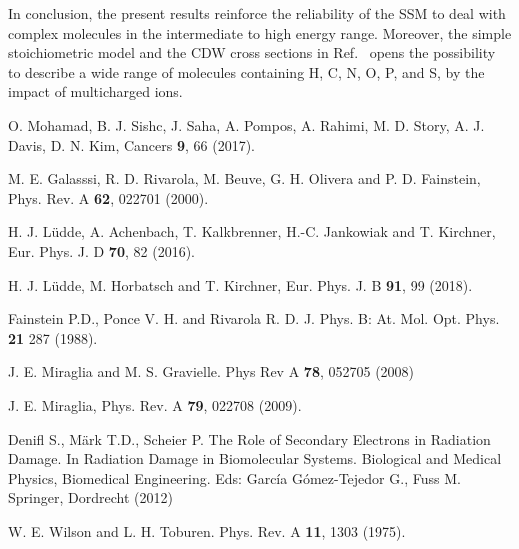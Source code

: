 \documentclass[10pt,showpacs,showkeys,twocolumn]{revtex4}
\begin{document}
In conclusion, the present results reinforce the 
reliability of the SSM to deal with complex molecules in the intermediate
to high energy range. Moreover, the simple stoichiometric model and the 
CDW cross sections in Ref.~\cite{miraglia2019} opens the possibility to 
describe a wide range of molecules containing H, C, N, O, P, and S, by 
the impact of multicharged ions.


\bigskip

\begin{thebibliography}{}

O. Mohamad, B. J. Sishc, J. Saha, A. Pompos, A. Rahimi, M. D. Story, A. J. Davis, D. N. Kim, 
Cancers \textbf{9}, 66 (2017).

M. E. Galasssi, R. D. Rivarola, M. Beuve, G. H. Olivera and P. D. Fainstein, 
Phys. Rev. A \textbf{62}, 022701 (2000).

H. J. L\"udde, A. Achenbach, T. Kalkbrenner, H.-C. Jankowiak and T. Kirchner,
Eur. Phys. J. D \textbf{70}, 82 (2016).

H. J. L\"udde, M. Horbatsch and T. Kirchner,
Eur. Phys. J. B \textbf{91}, 99 (2018).

Fainstein P.D., Ponce V. H. and Rivarola R. D. 
J. Phys. B: At. Mol. Opt. Phys. \textbf{21} 287 (1988).

J. E. Miraglia and M. S. Gravielle. 
Phys Rev A \textbf{78}, 052705 (2008)

J. E. Miraglia, 
Phys. Rev. A \textbf{79}, 022708 (2009).

Denifl S., Märk T.D., Scheier P. 
The Role of Secondary Electrons in Radiation Damage. 
In Radiation Damage in Biomolecular Systems. Biological and Medical Physics, Biomedical Engineering. 
Eds: García Gómez-Tejedor G., Fuss M. 
Springer, Dordrecht (2012) 

W. E. Wilson and L. H. Toburen. 
Phys. Rev. A \textbf{11}, 1303 (1975).


\end{thebibliography}
\end{document}
